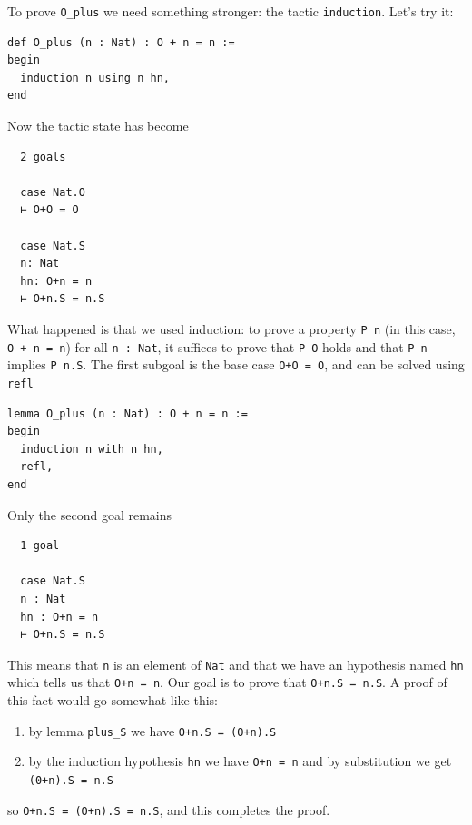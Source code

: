 \documentclass{book}
\theoremstyle{definition}
\theoremstyle{remark}
\theoremstyle{plain}
\begin{document}
To prove \lstinline{O_plus} we need something stronger: the tactic \lstinline{induction}.
Let's try it:
\begin{lstlisting}
def O_plus (n : Nat) : O + n = n :=
begin
  induction n using n hn,
end
\end{lstlisting}
Now the tactic state has become
\begin{lstlisting}
  2 goals

  case Nat.O
  ⊢ O+O = O

  case Nat.S
  n: Nat
  hn: O+n = n
  ⊢ O+n.S = n.S
\end{lstlisting}
What happened is that we used induction:
to prove a property \lstinline{P n} (in this case, \lstinline{O + n = n}) for all \lstinline{n : Nat},
it suffices to prove that \lstinline{P O} holds and that \lstinline{P n} implies \lstinline{P n.S}.
The first subgoal is the base case \lstinline{O+O = O}, and can be solved using \lstinline{refl}
\begin{lstlisting}
lemma O_plus (n : Nat) : O + n = n :=
begin
  induction n with n hn,
  refl,
end
\end{lstlisting}
Only the second goal remains
\begin{lstlisting}
  1 goal

  case Nat.S
  n : Nat
  hn : O+n = n
  ⊢ O+n.S = n.S
\end{lstlisting}
This means that \lstinline{n} is an element of \lstinline{Nat}
and that we have an hypothesis named \lstinline{hn} which tells us that \lstinline{O+n = n}.
Our goal is to prove that \lstinline{O+n.S = n.S}.
A proof of this fact would go somewhat like this:
\begin{enumerate}
\item by lemma \lstinline{plus_S} we have \lstinline{O+n.S = (O+n).S}
\item by the induction hypothesis \lstinline{hn} we have \lstinline{O+n = n} and by substitution we get \lstinline{(0+n).S = n.S}
\end{enumerate}
so \lstinline{O+n.S = (O+n).S = n.S}, and this completes the proof.
\end{document}
